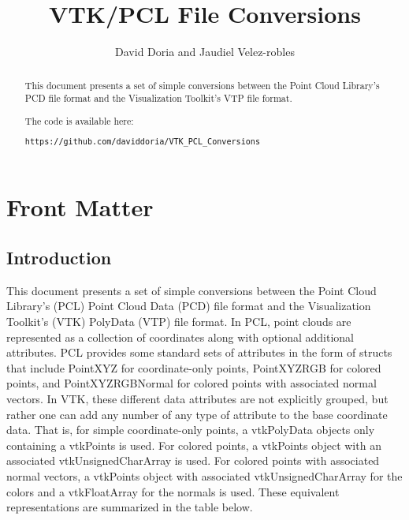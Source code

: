 \documentclass{ComputationalAlgorithmsArticle}
\title{VTK/PCL File Conversions}
\author{David Doria and Jaudiel Velez-robles}
\newcommand{\IJhandlerIDnumber}{3303}
\begin{document}
\IJhandlefooter{\IJhandlerIDnumber}


\ifpdf
\else
\fi


\maketitle


\ifhtml
\chapter*{Front Matter\label{front}}
\fi

\begin{abstract}
\noindent

This document presents a set of simple conversions between the Point Cloud Library's PCD file format and the Visualization Toolkit's VTP file format.

The code is available here:
\begin{verbatim}
https://github.com/daviddoria/VTK_PCL_Conversions 
\end{verbatim}


\end{abstract}

\IJhandlenote{\IJhandlerIDnumber}

\tableofcontents
\section{Introduction}
This document presents a set of simple conversions between the Point Cloud Library's (PCL) Point Cloud Data (PCD) file format and the Visualization Toolkit's (VTK) PolyData (VTP) file format. In PCL, point clouds are represented as a collection of coordinates along with optional additional attributes. PCL provides some standard sets of attributes in the form of structs that include PointXYZ for coordinate-only points, PointXYZRGB for colored points, and PointXYZRGBNormal for colored points with associated normal vectors. In VTK, these different data attributes are not explicitly grouped, but rather one can add any number of any type of attribute to the base coordinate data. That is, for simple coordinate-only points, a vtkPolyData objects only containing a vtkPoints is used. For colored points, a vtkPoints object with an associated vtkUnsignedCharArray is used. For colored points with associated normal vectors, a vtkPoints object with associated vtkUnsignedCharArray for the colors and a vtkFloatArray for the normals is used. These equivalent representations are summarized in the table below.
\end{document}
